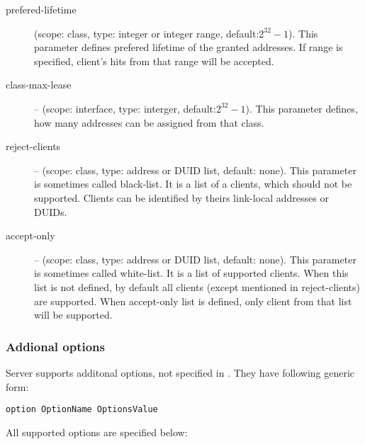 \begin{description}
\item[prefered-lifetime] (scope: class, type: integer or integer range,
	    default:$2^{32}-1$). This parameter defines prefered
            lifetime of the granted addresses. If range is specified,
            client's hits from that range will be accepted.
\item[class-max-lease]  -- (scope: interface, type: interger,
            default:$2^{32}-1$). This parameter defines, how many
            addresses can be assigned from that class.
\item[reject-clients] -- (scope: class, type: address or DUID list,
            default: none). This parameter is sometimes called
            black-list. It is a list of a clients, which should not be
            supported. Clients can be identified by theirs link-local
            addresses or DUIDs.
\item[accept-only] -- (scope: class, type: address or DUID list,
            default: none). This parameter is sometimes called
            white-list. It is a list of supported clients. When this
            list is not defined, by default all clients (except
            mentioned in reject-clients) are supported. When
            accept-only list is defined, only client from that list
            will be supported.
\end{description}

\subsubsection{Addional options}
Server supports additonal options, not specified in \cite{rfc3315}. They have
following generic form:

\begin{verbatim}
option OptionName OptionsValue
\end{verbatim}

All supported options are specified below:

